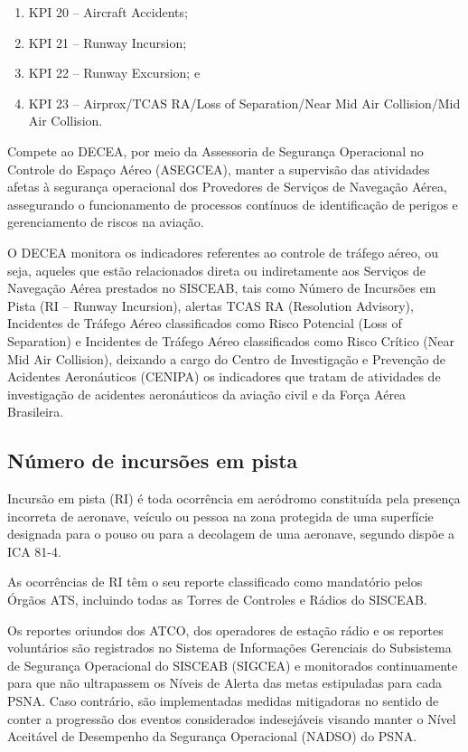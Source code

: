 \documentclass[
]{book}
\begin{document}
\begin{enumerate}
\def\labelenumi{\alph{enumi})}
\item
  KPI 20 -- Aircraft Accidents;
\item
  KPI 21 -- Runway Incursion;
\item
  KPI 22 -- Runway Excursion; e
\item
  KPI 23 -- Airprox/TCAS RA/Loss of Separation/Near Mid Air Collision/Mid Air Collision.
\end{enumerate}

Compete ao DECEA, por meio da Assessoria de Segurança Operacional no Controle do Espaço Aéreo (ASEGCEA), manter a supervisão das atividades afetas à segurança operacional dos Provedores de Serviços de Navegação Aérea, assegurando o funcionamento de processos contínuos de identificação de perigos e gerenciamento de riscos na aviação.

O DECEA monitora os indicadores referentes ao controle de tráfego aéreo, ou seja, aqueles que estão relacionados direta ou indiretamente aos Serviços de Navegação Aérea prestados no SISCEAB, tais como Número de Incursões em Pista (RI -- Runway Incursion), alertas TCAS RA (Resolution Advisory), Incidentes de Tráfego Aéreo classificados como Risco Potencial (Loss of Separation) e Incidentes de Tráfego Aéreo classificados como Risco Crítico (Near Mid Air Collision), deixando a cargo do Centro de Investigação e Prevenção de Acidentes Aeronáuticos (CENIPA) os indicadores que tratam de atividades de investigação de acidentes aeronáuticos da aviação civil e da Força Aérea Brasileira.

\hypertarget{nuxfamero-de-incursuxf5es-em-pista}{%
\subsection{Número de incursões em pista}\label{nuxfamero-de-incursuxf5es-em-pista}}

Incursão em pista (RI) é toda ocorrência em aeródromo constituída pela presença incorreta de aeronave, veículo ou pessoa na zona protegida de uma superfície designada para o pouso ou para a decolagem de uma aeronave, segundo dispõe a ICA 81-4.

As ocorrências de RI têm o seu reporte classificado como mandatório pelos Órgãos ATS, incluindo todas as Torres de Controles e Rádios do SISCEAB.

Os reportes oriundos dos ATCO, dos operadores de estação rádio e os reportes voluntários são registrados no Sistema de Informações Gerenciais do Subsistema de Segurança Operacional do SISCEAB (SIGCEA) e monitorados continuamente para que não ultrapassem os Níveis de Alerta das metas estipuladas para cada PSNA. Caso contrário, são implementadas medidas mitigadoras no sentido de conter a progressão dos eventos considerados indesejáveis visando manter o Nível Aceitável de Desempenho da Segurança Operacional (NADSO) do PSNA.
\end{document}
